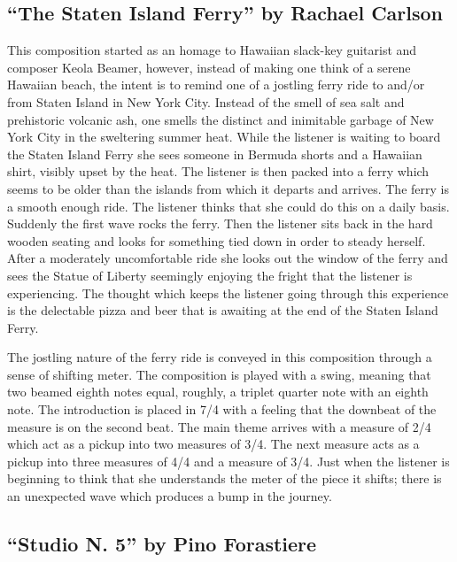 \documentclass{tufte-handout}
\begin{document}
\subsection*{``The Staten Island Ferry'' by Rachael Carlson}
This composition started as an homage to Hawaiian slack-key guitarist and composer Keola Beamer, however, instead of making one think of a serene Hawaiian beach, the intent is to remind one of a jostling ferry ride to and/or from Staten Island in New York City. Instead of the smell of sea salt and prehistoric volcanic ash, one smells the distinct and inimitable garbage of New York City in the sweltering summer heat. While the listener is waiting to board the Staten Island Ferry she sees someone in Bermuda shorts and a Hawaiian shirt, visibly upset by the heat. The listener is then packed into a ferry which seems to be older than the islands from which it departs and arrives. The ferry is a smooth enough ride. The listener thinks that she could do this on a daily basis. Suddenly the first wave rocks the ferry. Then the listener sits back in the hard wooden seating and looks for something tied down in order to steady herself. After a moderately uncomfortable ride she looks out the window of the ferry and sees the Statue of Liberty seemingly enjoying the fright that the listener is experiencing. The thought which keeps the listener going through this experience is the delectable pizza and beer that is awaiting at the end of the Staten Island Ferry.

The jostling nature of the ferry ride is conveyed in this composition through a sense of shifting meter. The composition is played with a swing, meaning that two beamed eighth notes equal, roughly, a triplet quarter note with an eighth note. The introduction is placed in 7/4 with a feeling that the downbeat of the measure is on the second beat. The main theme arrives with a measure of 2/4 which act as a pickup into two measures of 3/4. The next measure acts as a pickup into three measures of 4/4 and a measure of 3/4. Just when the listener is beginning to think that she understands the meter of the piece it shifts; there is an unexpected wave which produces a bump in the journey.

\subsection*{``Studio N. 5'' by Pino Forastiere}
\end{document}

